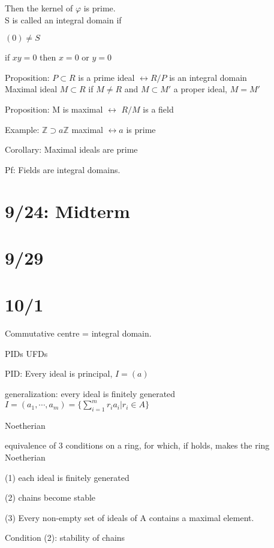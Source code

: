 \documentclass[12pt]{article}
\begin{document}
Then the kernel of $\varphi$ is prime.\\

\noindent
S is called an integral domain if 

$(0) \neq S$

if $xy = 0$ then $x = 0$ or $y = 0$

\noindent
Proposition: $P \subset R$ is a prime ideal $\leftrightarrow R/P$ is an integral domain\\

\noindent
Maximal ideal $M \subset R$ if $M \neq R$ and $M \subset M'$ a proper ideal, $M = M'$

\noindent
Proposition: M is maximal $\leftrightarrow$ $R/M$ is a field

\noindent
Example: $\mathds{Z} \supset a\mathds{Z}$ maximal $\leftrightarrow a$ is prime

\noindent
Corollary: Maximal ideals are prime

Pf: Fields are integral domains.

\section{9/24: Midterm}

\section{9/29}

\section{10/1}

Commutative centre = integral domain.

\noindent
PIDs UFDs

\noindent
PID: Every ideal is principal, $I = (a)$

generalization: every ideal is finitely generated $I = (a_1, \cdots, a_m) = \{\sum_{i=1}^mr_ia_i | r_i \in A\}$

Noetherian

\noindent
equivalence of 3 conditions on a ring, for which, if holds, makes the ring Noetherian

(1) each ideal is finitely generated

(2) chains become stable

(3) Every non-empty set of ideals of A contains a maximal element.

\noindent
Condition (2): stability of chains
\end{document}
